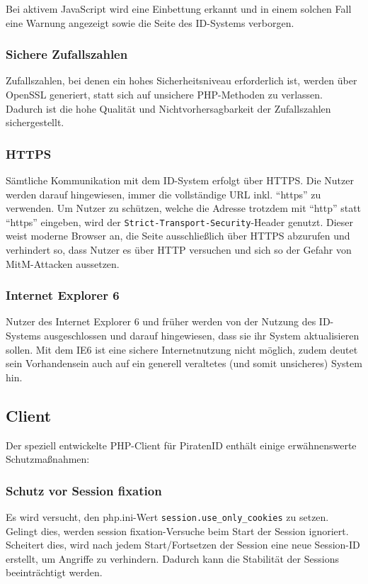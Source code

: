 Bei aktivem JavaScript wird eine Einbettung erkannt und in einem solchen Fall eine Warnung angezeigt sowie die Seite des ID-Systems verborgen.

\subsubsection{Sichere Zufallszahlen}
Zufallszahlen, bei denen ein hohes Sicherheitsniveau erforderlich ist, werden über OpenSSL generiert, statt sich auf unsichere PHP-Methoden zu verlassen.
Dadurch ist die hohe Qualität und Nichtvorhersagbarkeit der Zufallszahlen sichergestellt.

\subsubsection{HTTPS}
Sämtliche Kommunikation mit dem ID-System erfolgt über HTTPS.
Die Nutzer werden darauf hingewiesen, immer die vollständige URL inkl. "`https"' zu verwenden.
Um Nutzer zu schützen, welche die Adresse trotzdem mit "`http"' statt "`https"' eingeben, wird der \texttt{Strict-Transport-Security}-Header genutzt.
Dieser weist moderne Browser an, die Seite ausschließlich über HTTPS abzurufen und verhindert so,
dass Nutzer es über HTTP versuchen und sich so der Gefahr von MitM-Attacken aussetzen.

\subsubsection{Internet Explorer 6}
Nutzer des Internet Explorer 6 und früher werden von der Nutzung des ID-Systems ausgeschlossen und darauf hingewiesen, dass sie ihr System aktualisieren sollen.
Mit dem IE6 ist eine sichere Internetnutzung nicht möglich, zudem deutet sein Vorhandensein auch auf ein generell veraltetes (und somit unsicheres) System hin.



\subsection{Client}
\label{sec:security-client}
Der speziell entwickelte PHP-Client für PiratenID enthält einige erwähnenswerte Schutzmaßnahmen:

\subsubsection{Schutz vor Session fixation}
Es wird versucht, den php.ini-Wert \texttt{session.use\_only\_cookies} zu setzen.
Gelingt dies, werden session fixation-Versuche beim Start der Session ignoriert.
Scheitert dies, wird nach jedem Start/Fortsetzen der Session eine neue Session-ID erstellt, um Angriffe zu verhindern.
Dadurch kann die Stabilität der Sessions beeinträchtigt werden.

